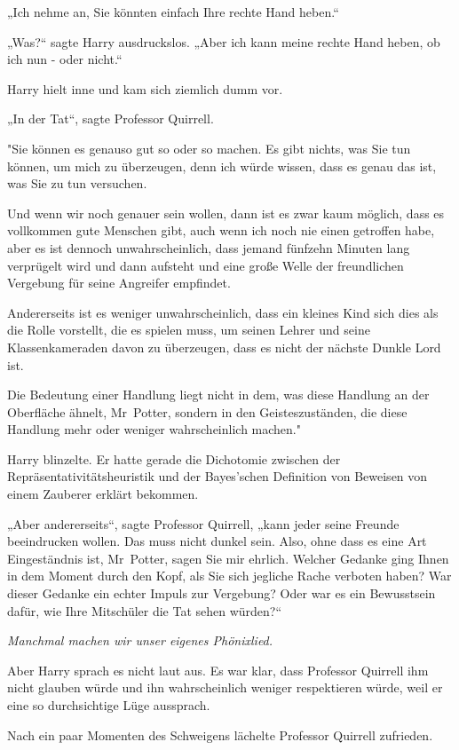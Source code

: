 {„Ich nehme an, Sie könnten einfach Ihre rechte Hand heben.“

„Was?“ sagte Harry ausdruckslos. „Aber ich kann meine rechte Hand heben, ob ich nun - oder nicht.“

Harry hielt inne und kam sich ziemlich dumm vor.

„In der Tat“, sagte Professor Quirrell.

"Sie können es genauso gut so oder so machen. Es gibt nichts, was Sie tun können, um mich zu überzeugen, denn ich würde wissen, dass es genau das ist, was Sie zu tun versuchen.

Und wenn wir noch genauer sein wollen, dann ist es zwar kaum möglich, dass es vollkommen gute Menschen gibt, auch wenn ich noch nie einen getroffen habe, aber es ist dennoch unwahrscheinlich, dass jemand fünfzehn Minuten lang verprügelt wird und dann aufsteht und eine große Welle der freundlichen Vergebung für seine Angreifer empfindet.

Andererseits ist es weniger unwahrscheinlich, dass ein kleines Kind sich dies als die Rolle vorstellt, die es spielen muss, um seinen Lehrer und seine Klassenkameraden davon zu überzeugen, dass es nicht der nächste Dunkle Lord ist.

Die Bedeutung einer Handlung liegt nicht in dem, was diese Handlung an der Oberfläche ähnelt, Mr~Potter, sondern in den Geisteszuständen, die diese Handlung mehr oder weniger wahrscheinlich machen."

Harry blinzelte. Er hatte gerade die Dichotomie zwischen der Repräsentativitätsheuristik und der Bayes'schen Definition von Beweisen von einem Zauberer erklärt bekommen.

„Aber andererseits“, sagte Professor Quirrell, „kann jeder seine Freunde beeindrucken wollen. Das muss nicht dunkel sein. Also, ohne dass es eine Art Eingeständnis ist, Mr~Potter, sagen Sie mir ehrlich. Welcher Gedanke ging Ihnen in dem Moment durch den Kopf, als Sie sich jegliche Rache verboten haben? War dieser Gedanke ein echter Impuls zur Vergebung? Oder war es ein Bewusstsein dafür, wie Ihre Mitschüler die Tat sehen würden?“

\emph{Manchmal machen wir unser eigenes Phönixlied.}

Aber Harry sprach es nicht laut aus. Es war klar, dass Professor Quirrell ihm nicht glauben würde und ihn wahrscheinlich weniger respektieren würde, weil er eine so durchsichtige Lüge aussprach.

Nach ein paar Momenten des Schweigens lächelte Professor Quirrell zufrieden.

}
